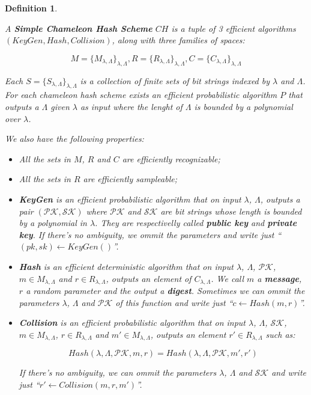 \documentclass[a4paper]{article}
\newtheorem{definicao}{Definition}
\begin{document}
\begin{definicao}
\label{def:SCHS}

A \textbf{Simple Chameleon Hash Scheme} $CH$ is a tuple of 3 efficient algorithms $(KeyGen, Hash, Collision)$, along with three families of spaces:
 
$$
 M=\{M_{\lambda,\Lambda}\}_{\lambda,\Lambda}, R=\{R_{\lambda,\Lambda}\}_{\lambda,\Lambda},
 C=\{C_{\lambda,\Lambda}\}_{\lambda,\Lambda}
$$
 
Each $S=\{S_{\lambda,\Lambda}\}_{\lambda,\Lambda}$ is a collection of finite sets of bit strings indexed by $\lambda$ and $\Lambda$. For each chameleon hash scheme exists an efficient probabilistic algorithm $P$ that outputs a $\Lambda$ given $\lambda$ as input where the lenght of $\Lambda$ is bounded by a polynomial over $\lambda$.
 
We also have the following properties:
 
\begin{itemize}

 \item All the sets in $M$, $R$ and $C$ are efficiently recognizable;

 \item All the sets in $R$ are efficiently sampleable;

 \item\textbf{KeyGen} is an efficient probabilistic algorithm that on
 input $\lambda$,
 $\Lambda$, outputs a pair $(\mathcal{PK}, \mathcal{SK})$ where
 $\mathcal{PK}$
 and $\mathcal{SK}$ are bit strings whose length is bounded by a
 polynomial in
 $\lambda$. They are respectivelly called \textbf{public key} and 
 \textbf{private key}. If there's no ambiguity, we ommit the
 parameters and write just ``$(pk, sk) \leftarrow KeyGen()$''.
 
 \item\textbf{Hash} is an efficient deterministic algorithm that on
 input $\lambda$, $\Lambda$, $\mathcal{PK}$, $m \in M_{\lambda,\Lambda}$ and
 $r \in R_{\lambda,\Lambda}$, outputs an element of
 $C_{\lambda,\Lambda}$. We call $m$ a \textbf{message}, $r$ a random parameter and the output a \textbf{digest}. Sometimes we can ommit the parameters $\lambda$,
 $\Lambda$ and $\mathcal{PK}$ of this function and write just 
 ``$c \leftarrow Hash(m, r)$''.
 
 \item\textbf{Collision} is an efficient probabilistic algorithm that on input $\lambda$, $\Lambda$, $\mathcal{SK}$, $m \in M_{\lambda,\Lambda}$,
 $r \in R_{\lambda,\Lambda}$ and $m' \in M_{\lambda,\Lambda}$, outputs an element $r' \in R_{\lambda,\Lambda}$ such as:
 
 $$
 Hash(\lambda, \Lambda, \mathcal{PK}, m, r) = Hash(\lambda, \Lambda, \mathcal{PK}, m', r')
 $$
 
 If there's no ambiguity, we can ommit the parameters $\lambda$,
 $\Lambda$ and $\mathcal{SK}$ and write just ``$r' \leftarrow
 Collision(m, r, m')$''.

\end{itemize}

\end{definicao}
 
\end{document}
